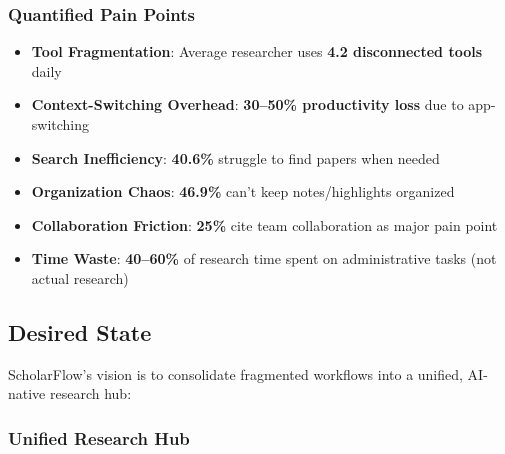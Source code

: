 \subsubsection{Quantified Pain Points}

\begin{itemize}
    \item \textbf{Tool Fragmentation}: Average researcher uses \textbf{4.2 disconnected tools} daily
    \item \textbf{Context-Switching Overhead}: \textbf{30--50\% productivity loss} due to app-switching
    \item \textbf{Search Inefficiency}: \textbf{40.6\%} struggle to find papers when needed
    \item \textbf{Organization Chaos}: \textbf{46.9\%} can't keep notes/highlights organized
    \item \textbf{Collaboration Friction}: \textbf{25\%} cite team collaboration as major pain point
    \item \textbf{Time Waste}: \textbf{40--60\%} of research time spent on administrative tasks (not actual research)
\end{itemize}

\subsection{Desired State}

ScholarFlow's vision is to consolidate fragmented workflows into a unified, AI-native research hub:

\subsubsection{Unified Research Hub}

